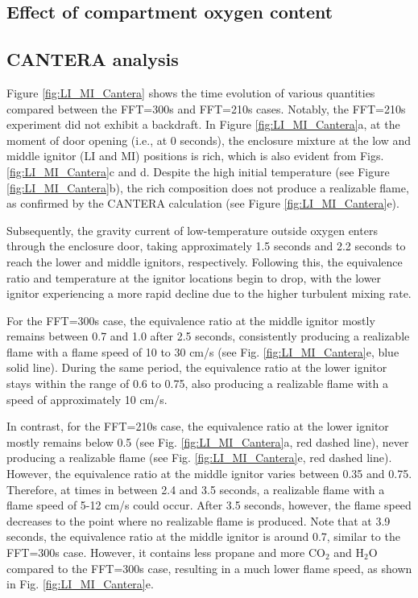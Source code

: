 \documentclass[12pt,letterpaper]{article}
\begin{document}
\begin{flushleft}
\subsection{Effect of compartment oxygen content}
\label{sec:resfuel}

\subsection{CANTERA analysis}
\label{sec:CANTERAAnalysis}

Figure \ref{fig:LI_MI_Cantera} shows the time evolution of various quantities compared between the FFT=300s and FFT=210s cases. Notably, the FFT=210s experiment did not exhibit a backdraft. In Figure \ref{fig:LI_MI_Cantera}a, at the moment of door opening (i.e., at 0 seconds), the enclosure mixture at the low and middle ignitor (LI and MI) positions is rich, which is also evident from Figs. \ref{fig:LI_MI_Cantera}c and d. Despite the high initial temperature (see Figure \ref{fig:LI_MI_Cantera}b), the rich composition does not produce a realizable flame, as confirmed by the CANTERA calculation (see Figure \ref{fig:LI_MI_Cantera}e).

Subsequently, the gravity current of low-temperature outside oxygen enters through the enclosure door, taking approximately 1.5 seconds and 2.2 seconds to reach the lower and middle ignitors, respectively. Following this, the equivalence ratio and temperature at the ignitor locations begin to drop, with the lower ignitor experiencing a more rapid decline due to the higher turbulent mixing rate.

For the FFT=300s case, the equivalence ratio at the middle ignitor mostly remains between 0.7 and 1.0 after 2.5 seconds, consistently producing a realizable flame with a flame speed of 10 to 30 cm/s (see Fig. \ref{fig:LI_MI_Cantera}e, blue solid line). During the same period, the equivalence ratio at the lower ignitor stays within the range of 0.6 to 0.75, also producing a realizable flame with a speed of approximately 10 cm/s.

In contrast, for the FFT=210s case, the equivalence ratio at the lower ignitor mostly remains below 0.5 (see Fig. \ref{fig:LI_MI_Cantera}a, red dashed line), never producing a realizable flame (see Fig. \ref{fig:LI_MI_Cantera}e, red dashed line). However, the equivalence ratio at the middle ignitor varies between 0.35 and 0.75. Therefore, at times in between 2.4 and 3.5 seconds, a realizable flame with a flame speed of 5-12 cm/s could occur. After 3.5 seconds, however, the flame speed decreases to the point where no realizable flame is produced. Note that at 3.9 seconds, the equivalence ratio at the middle ignitor is around 0.7, similar to the FFT=300s case. However, it contains less propane and more $\mathrm{CO_2}$ and $\mathrm{H_2O}$ compared to the FFT=300s case, resulting in a much lower flame speed, as shown in Fig. \ref{fig:LI_MI_Cantera}e.


\end{flushleft}
\end{document}
